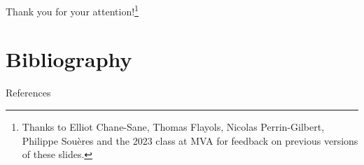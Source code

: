 \documentclass[10pt, aspectratio=1610]{beamer}
\begin{document}
\begin{frame}[standout]
    Thank you for your attention!\footnote{\color{white} Thanks to Elliot Chane-Sane, Thomas Flayols, Nicolas Perrin-Gilbert, Philippe Sou\`{e}res and the 2023 class at MVA for feedback on previous versions of these slides.}
\end{frame}

\section*{Bibliography}

\renewcommand*{\bibfont}{\footnotesize}
\begin{frame}[allowframebreaks]{References}
    \printbibliography[heading=none]
\end{frame}
\end{document}
